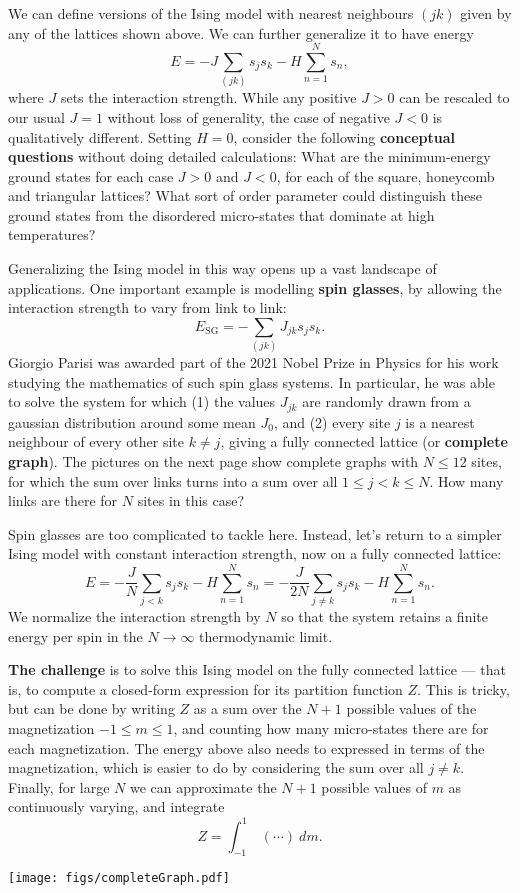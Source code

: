 \documentclass[12 pt]{article} %
\begin{document}
We can define versions of the Ising model with nearest neighbours $(jk)$ given by any of the lattices shown above.
We can further generalize it to have energy
\begin{equation*}
  E = -J \sum_{(jk)} s_j s_k - H \sum_{n = 1}^N s_n,
\end{equation*}
where $J$ sets the interaction strength.
While any positive $J > 0$ can be rescaled to our usual $J = 1$ without loss of generality, the case of negative $J < 0$ is qualitatively different.
Setting $H = 0$, consider the following \textbf{conceptual questions} without doing detailed calculations:
What are the minimum-energy ground states for each case $J > 0$ and $J < 0$, for each of the square, honeycomb and triangular lattices?
What sort of order parameter could distinguish these ground states from the disordered micro-states that dominate at high temperatures?

Generalizing the Ising model in this way opens up a vast landscape of applications.
One important example is modelling \textbf{spin glasses}, by allowing the interaction strength to vary from link to link:
\begin{equation*}
  E_{\text{SG}} = -\sum_{(jk)} J_{jk} s_j s_k.
\end{equation*}
Giorgio Parisi was awarded part of the 2021 Nobel Prize in Physics for his work studying the mathematics of such spin glass systems.
In particular, he was able to solve the system for which (1) the values $J_{jk}$ are randomly drawn from a gaussian distribution around some mean $J_0$, and (2) every site $j$ is a nearest neighbour of every other site $k \ne j$, giving a fully connected lattice (or \textbf{complete graph}).
The pictures on the next page show complete graphs with $N \leq 12$ sites, for which the sum over links turns into a sum over all $1 \leq j < k \leq N$.
How many links are there for $N$ sites in this case?

Spin glasses are too complicated to tackle here.
Instead, let's return to a simpler Ising model with constant interaction strength, now on a fully connected lattice:
\begin{equation*}
  E = -\frac{J}{N} \sum_{j < k} s_j s_k - H \sum_{n = 1}^N s_n = -\frac{J}{2N} \sum_{j \neq k} s_j s_k - H \sum_{n = 1}^N s_n.
\end{equation*}
We normalize the interaction strength by $N$ so that the system retains a finite energy per spin in the $N \to \infty$ thermodynamic limit.

\textbf{The challenge} is to solve this Ising model on the fully connected lattice --- that is, to compute a closed-form expression for its partition function $Z$.
This is tricky, but can be done by writing $Z$ as a sum over the $N + 1$ possible values of the magnetization $-1 \leq m \leq 1$, and counting how many micro-states there are for each magnetization.
The energy above also needs to expressed in terms of the magnetization, which is easier to do by considering the sum over all $j \neq k$.
Finally, for large $N$ we can approximate the $N + 1$ possible values of $m$ as continuously varying, and integrate
\begin{equation*}
  Z = \int_{-1}^1 \ (\cdots) \ dm.
\end{equation*}

\begin{center}\texttt{[image: figs/completeGraph.pdf]}\end{center}
\end{document}
